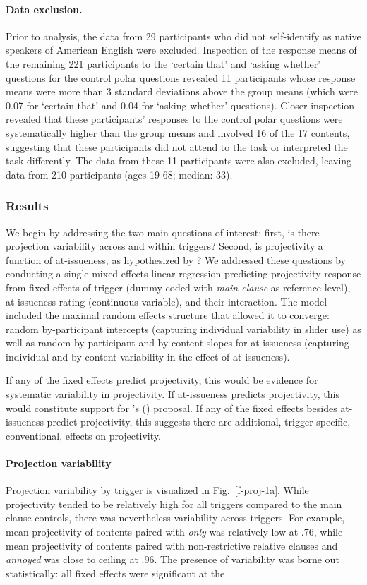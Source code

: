 \documentclass[11pt,fleqn]{article}
\newcommand{\6}{\mbox{$[\hspace*{-.6mm}[$}}
\newcommand{\9}{\mbox{$]\hspace*{-.6mm}]$}}
\newcommand{\citetpos}[1]{\citeauthor{#1}'s (\citeyear{#1})}
\newcommand{\figref}[1]{Fig.~\ref{#1}}
\begin{document}
\paragraph{Data exclusion.}
Prior to analysis, the data from 29 participants who did not self-identify as native speakers of American English were excluded. Inspection of the response means of the remaining 221 participants to the `certain that' and `asking whether' questions for the control polar questions revealed 11 participants whose response means were more than 3 standard deviations above the group means (which were 0.07 for `certain that' and 0.04 for `asking whether' questions). Closer inspection revealed that these participants' responses to the control polar questions were systematically higher than the group means and involved 16 of the 17 contents, suggesting that these participants did not attend to the task or interpreted the task differently. The data from these 11 participants were also excluded, leaving data from 210 participants (ages 19-68; median: 33).  


\subsubsection{Results}

We begin by addressing the two main questions of interest: first, is there projection variability across and within triggers? Second, is projectivity a function of at-issueness, as hypothesized by \citet{brst-salt10}? We addressed these questions by conducting a single mixed-effects linear regression predicting projectivity response from fixed effects of trigger (dummy coded with \emph{main clause} as reference level), at-issueness rating (continuous variable), and their interaction. The model included the maximal random effects structure that allowed it to converge: random by-participant intercepts (capturing individual variability in slider use) as well as random by-participant and by-content slopes for at-issueness (capturing individual and by-content variability in the effect of at-issueness).

If any of the fixed effects predict projectivity, this would be evidence for systematic variability in projectivity. If at-issueness predicts projectivity, this would constitute support for \citetpos{brst-salt10} proposal. If any of the fixed effects besides at-issueness predict projectivity, this suggests there are additional, trigger-specific, conventional, effects on projectivity. 


\paragraph{Projection variability} Projection variability by trigger is visualized in \figref{f-proj-1a}. While projectivity tended to be relatively high for all triggers compared to the main clause controls, there was nevertheless variability across triggers. For example, mean projectivity of contents paired with \emph{only} was relatively low at .76, while mean projectivity of contents paired with non-restrictive relative clauses and \emph{annoyed} was close to ceiling at .96. The presence of variability was borne out statistically: all fixed effects were significant at the 
\end{document}

